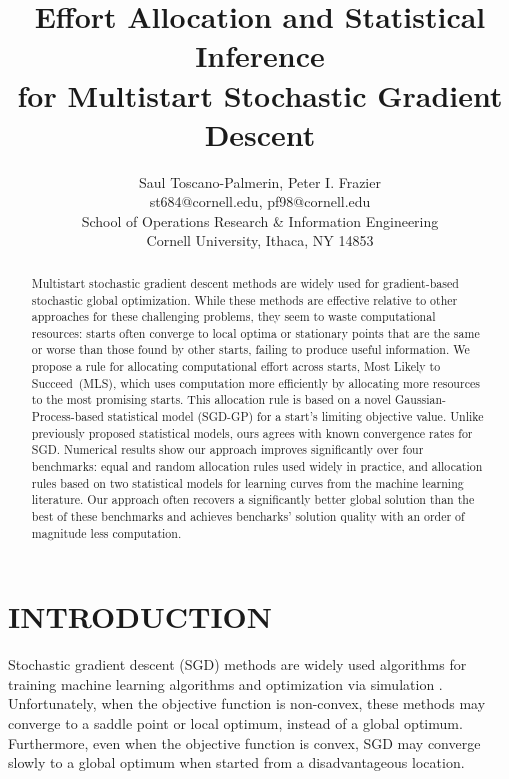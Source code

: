 \documentclass[12pt,english]{article}
\date{}
\newcommand{\abbrv}{MLS}
\newcommand{\name}{Most Likely to Succeed}
\begin{document}
\title{Effort Allocation and Statistical Inference\\ for Multistart Stochastic Gradient Descent}


\author{Saul Toscano-Palmerin, Peter I. Frazier\\
st684@cornell.edu, pf98@cornell.edu\\
School of Operations Research \& Information Engineering\\
Cornell University, Ithaca, NY 14853\\
}


\maketitle



\begin{abstract} 
Multistart stochastic gradient descent methods are widely used for gradient-based stochastic global optimization.  While these methods are effective relative to other approaches for these challenging problems, they seem to waste computational resources: starts often converge to local optima or stationary points that are the same or worse than those found by other starts, failing to produce useful information.  
We propose a rule for allocating computational effort across starts, \name\ (\abbrv), which uses computation more efficiently by allocating more resources to the most promising starts.  This allocation rule is based on a novel Gaussian-Process-based statistical model (SGD-GP) for a start's limiting objective value.  Unlike previously proposed statistical models, ours agrees with known convergence rates for SGD. 
Numerical results show our approach improves significantly over four benchmarks:
equal and random allocation rules used widely in practice,
and allocation rules based on two statistical models for learning curves from the machine learning literature.
Our approach often recovers a significantly better global solution than the best of these benchmarks 
and achieves bencharks' solution quality with an order of magnitude less computation.
\end{abstract}


\section{INTRODUCTION}
\label{sec:intro}

Stochastic gradient descent (SGD) methods \citep{robbins,sgd:Nemirovski,adam} are widely used algorithms for training machine learning algorithms \citep{cnn_cifar,murphy2012machine} and optimization via simulation \citep{fu2015}.
Unfortunately, when the objective function is non-convex, these methods may converge to a saddle point or local optimum, instead of a global optimum. Furthermore, even when the objective function is convex, SGD may converge slowly to a global optimum when started from a disadvantageous location. 
\end{document}
